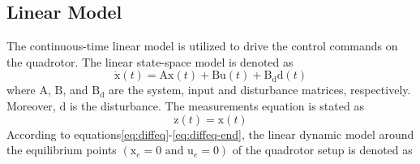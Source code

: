 \documentclass[3p,times]{elsarticle}
\begin{document}
\subsection{Linear Model}
\noindent The continuous-time linear model is utilized to drive the control commands on the quadrotor. The linear state-space model is denoted as
\begin{equation}\label{eq:linear}
	\boldsymbol{\dot{\mathrm{x}}}(t) = \boldsymbol{\mathrm{Ax}}(t) + \boldsymbol{\mathrm{Bu}}(t) + \boldsymbol{\mathrm{B_{d}d}}(t)
\end{equation}
where $\boldsymbol{\mathrm{A}}$, $\boldsymbol{\mathrm{B}}$, and $\boldsymbol{\mathrm{B_d}}$ are the system, input and disturbance matrices, respectively. Moreover, $\boldsymbol{\mathrm{d}}$ is the disturbance. The measurements equation is stated as
\begin{equation}
	\boldsymbol{{\mathrm{z}}}(t) = \boldsymbol{\mathrm{x}}(t)
\end{equation}
According to equations\eqref{eq:diffeq}-\eqref{eq:diffeq-end}, the linear dynamic model around the equilibrium points $(\boldsymbol{{\mathrm{x}}}_e\!=\!0 \text{ and } \boldsymbol{{\mathrm{u}}}_e\!=\!0)$ of the quadrotor setup is denoted as
\end{document}
